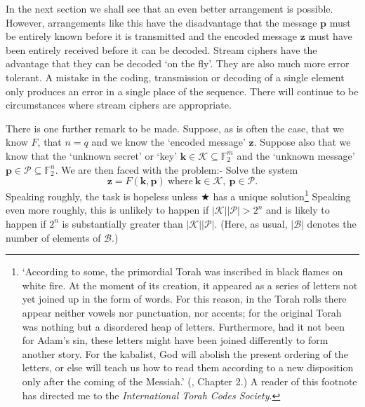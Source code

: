 \documentclass[12pt,a4paper]{article}
\theoremstyle{plain}
\theoremstyle{definition}
\begin{document}
In the next section we shall see that an even
better arrangement is possible. However, arrangements
like this have the disadvantage that
the message ${\mathbf p}$ must be entirely known
before it is transmitted  and the encoded
message ${\mathbf z}$ must have been entirely
received before it can be decoded. Stream ciphers
have the advantage that they can be decoded
`on the fly'. They are also much more error
tolerant. A mistake in the coding, transmission
or decoding of a single element only produces
an error in a single place of the sequence.
There will continue to be circumstances
where stream ciphers are appropriate.

There is one further remark to be made.
Suppose, as is often the case, that
we know $F$, that $n=q$
and we know the `encoded message'
${\mathbf z}$. Suppose also
that we know that the `unknown secret' or `key'
${\mathbf k}\in \mathcal{K}\subseteq {\mathbb F}_{2}^{m}$
and the
`unknown message' 
${\mathbf p}\in \mathcal{P}\subseteq {\mathbb F}_{2}^{n}$.
We are then faced with the problem:-
Solve the system
\begin{equation*}
{\mathbf z}=F({\mathbf k},{\mathbf p})
\ \text{where}\ {\mathbf k}\in \mathcal{K},
\  {\mathbf p}\in \mathcal{P}. \tag*{$\bigstar$}
\end{equation*}
Speaking roughly, the task is
hopeless unless $\bigstar$ has a unique
solution\footnote{`According to some, the primordial
Torah was inscribed in black flames on white fire.
At the moment of its creation, it appeared as a series
of letters not yet joined up in the form of words.
For this reason, in the Torah rolls there appear neither
vowels nor punctuation, nor accents; for the original
Torah was nothing but a disordered heap of letters.
Furthermore, had it not been for Adam's sin, these letters
might have been joined differently to form
another story. For the kabalist, God will abolish the
present ordering of the letters, or else will teach us
how to read them according to a new disposition
only after the coming of the Messiah.' (\cite{Eco}, Chapter 2.)
A reader of this footnote has directed me to the 
\emph{International Torah Codes Society}.}
Speaking even more roughly, this is unlikely to happen
if $|\mathcal{K}||\mathcal{P}|>2^{n}$ and is
likely to happen if $2^{n}$ is substantially
greater than $|\mathcal{K}||\mathcal{P}|$.
(Here, as usual, $|\mathcal{B}|$
denotes the number of elements of $\mathcal{B}$.)
\end{document}
